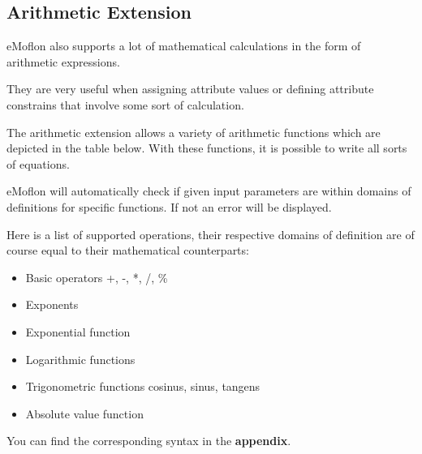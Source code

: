 {%

\subsection{Arithmetic Extension}

eMoflon also supports a lot of mathematical calculations in the form of arithmetic expressions.

They are very useful when assigning attribute values or defining attribute constrains that involve some sort of calculation.\newline

The arithmetic extension allows a variety of arithmetic functions which are depicted in the table below. With these functions, it is possible to write all sorts of equations.

eMoflon will automatically check if given input parameters are within domains of definitions for specific functions. If not an error will be displayed.\newline

Here is a list of supported operations, their respective domains of definition are of course equal to their mathematical counterparts:

\begin{itemize}
    \item Basic operators +, -, *, /, \%
    
    \item Exponents
    
    \item Exponential function
    \item Logarithmic functions
    \item Trigonometric functions cosinus, sinus, tangens
    \item Absolute value function
\end{itemize}

You can find the corresponding syntax in the \textbf{appendix}.\newline



}
